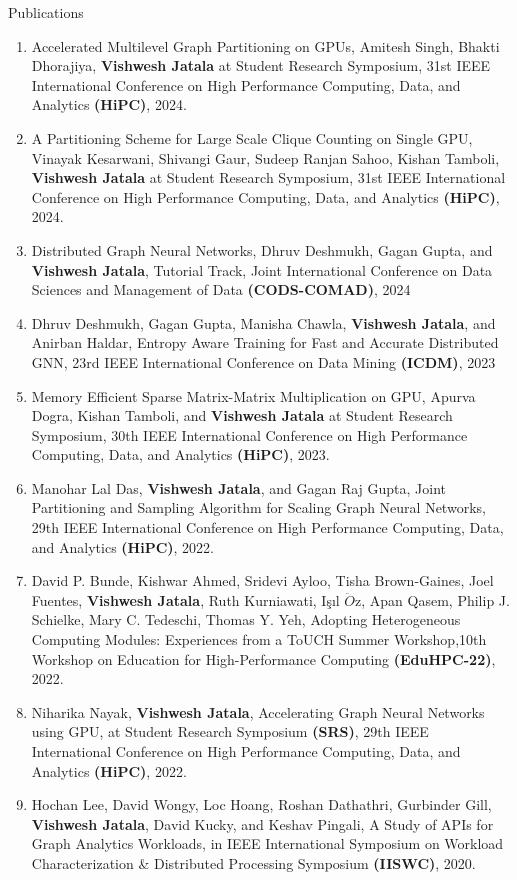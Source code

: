 \documentclass{resume} %
\begin{document}
\begin{rSection}{Publications}
\begin{enumerate}
\item Accelerated Multilevel Graph Partitioning on GPUs, Amitesh Singh, Bhakti Dhorajiya, \textbf{Vishwesh Jatala} at Student Research Symposium, 31st IEEE International Conference on High Performance Computing, Data, and Analytics \textbf{(HiPC)}, 2024.
\item A Partitioning Scheme for Large Scale Clique Counting on Single GPU, Vinayak Kesarwani, Shivangi Gaur, Sudeep Ranjan Sahoo, Kishan Tamboli, \textbf{Vishwesh Jatala} at Student Research Symposium, 31st IEEE International Conference on High Performance Computing, Data, and Analytics \textbf{(HiPC)}, 2024.		
\item Distributed Graph Neural Networks, Dhruv Deshmukh, Gagan Gupta, and \textbf{Vishwesh Jatala}, Tutorial Track, Joint International Conference on Data Sciences and Management of Data \textbf{(CODS-COMAD)}, 2024
\item  Dhruv Deshmukh, Gagan Gupta, Manisha Chawla, \textbf{Vishwesh Jatala}, and Anirban Haldar, Entropy Aware Training for Fast and Accurate Distributed GNN, 23rd IEEE International Conference on Data Mining \textbf{(ICDM)}, 2023
\item Memory Efficient Sparse Matrix-Matrix Multiplication on GPU, Apurva Dogra, Kishan Tamboli, and \textbf{Vishwesh Jatala} at Student Research Symposium, 30th IEEE International Conference on High Performance Computing, Data, and Analytics \textbf{(HiPC)}, 2023.
\item  Manohar Lal Das, \textbf{Vishwesh Jatala}, and Gagan Raj Gupta, Joint Partitioning and Sampling Algorithm for Scaling Graph Neural Networks, 29th IEEE International Conference on High Performance Computing, Data, and Analytics \textbf{(HiPC)}, 2022.  
\item David P. Bunde, Kishwar Ahmed, Sridevi Ayloo, Tisha Brown-Gaines, Joel Fuentes, \textbf{Vishwesh Jatala}, Ruth Kurniawati, I\c{s}ıl $\ddot{O}$z, Apan Qasem, Philip J. Schielke, Mary C. Tedeschi, Thomas Y. Yeh, Adopting Heterogeneous Computing Modules: Experiences from a ToUCH Summer Workshop,10th Workshop on Education for High-Performance Computing \textbf{(EduHPC-22)}, 2022. 
\item Niharika Nayak, \textbf{Vishwesh Jatala}, Accelerating Graph Neural Networks using GPU, at Student Research Symposium \textbf{(SRS)}, 29th IEEE International Conference on High Performance Computing, Data, and Analytics \textbf{(HiPC)}, 2022.
\item Hochan Lee, David Wongy, Loc Hoang, Roshan Dathathri, Gurbinder Gill, \textbf{Vishwesh Jatala}, David Kucky, and Keshav Pingali, A Study of APIs for Graph Analytics Workloads, in IEEE International Symposium on Workload Characterization \& Distributed Processing Symposium \textbf{(IISWC)}, 2020.

\end{enumerate}
\end{rSection}
\end{document}
